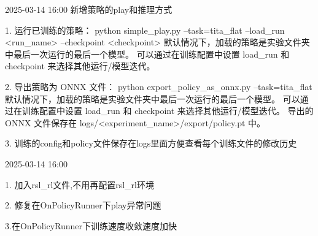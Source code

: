 2025-03-14 16:00
    新增策略的play和推理方式

        1. 运行已训练的策略：
            python simple_play.py --task=tita_flat --load_run <run_name> --checkpoint <checkpoint>
            默认情况下，加载的策略是实验文件夹中最后一次运行的最后一个模型。
            可以通过在训练配置中设置 load_run 和 checkpoint 来选择其他运行/模型迭代。

        2. 导出策略为 ONNX 文件：
            python export_policy_as_onnx.py --task=tita_flat
            默认情况下，加载的策略是实验文件夹中最后一次运行的最后一个模型。
            可以通过在训练配置中设置 load_run 和 checkpoint 来选择其他运行/模型迭代。
            导出的 ONNX 文件保存在 logs/<experiment_name>/export/policy.pt 中。

        3. 训练的config和policy文件保存在logs里面方便查看每个训练文件的修改历史

2025-03-14 16:00

        1. 加入rsl_rl文件,不用再配置rsl_rl环境
        
        2. 修复在OnPolicyRunner下play异常问题

        3.在OnPolicyRunner下训练速度收敛速度加快
